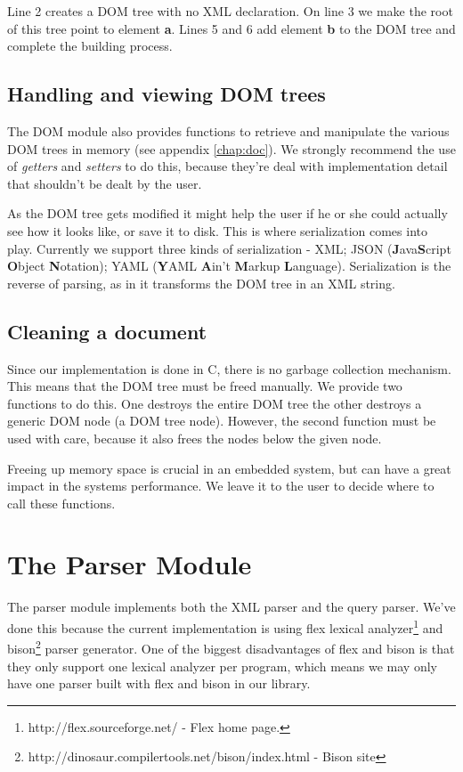 \documentclass[a4paper]{report}
\begin{document}
		Line 2 creates a DOM tree with no XML declaration. On line 3 we make the root of this tree point to element \textbf{a}. Lines 5 and 6 add element \textbf{b} to the DOM tree and complete the building process.
		
	\subsection{Handling and viewing DOM trees}
		The DOM module also provides functions to retrieve and manipulate the various DOM trees in memory (see appendix \ref{chap:doc}). We strongly recommend the use of \emph{getters} and \emph{setters} to do this,
		because they're deal with implementation detail that shouldn't be dealt by the user.
		
		As the DOM tree gets modified it might help the user if he or she could actually see how it looks like, or save it to disk. This is where serialization comes into play. Currently we support three kinds of serialization - XML; 
		JSON (\textbf{J}ava\textbf{S}cript \textbf{O}bject \textbf{N}otation); YAML (\textbf{Y}AML \textbf{A}in't \textbf{M}arkup \textbf{L}anguage). Serialization is the reverse of parsing, as in it transforms the DOM tree in an XML
		string.
		
	\subsection{Cleaning a document}
		Since our implementation is done in C, there is no garbage collection mechanism. This means that the DOM tree must be freed manually. We provide two functions to do this. One destroys the entire DOM tree the 
		other destroys a generic DOM node (a DOM tree node). However, the second function must be used with care, because it also frees the nodes below the given node.
		
		Freeing up memory space is crucial in an embedded system, but can have a great impact in the systems performance. We leave it to the user to decide where to call these functions.

\section{The Parser Module}\label{sec:parser}
	The parser module implements both the XML parser and the query parser. We've done this because the current implementation is using flex lexical analyzer\footnote{http://flex.sourceforge.net/ - Flex home page.} and 
	bison\footnote{http://dinosaur.compilertools.net/bison/index.html - Bison site} parser generator. One of the biggest disadvantages of flex and bison is that they only support one lexical analyzer per program, which means 
	we may only have one parser built with flex and bison in our library.
	
\end{document}
